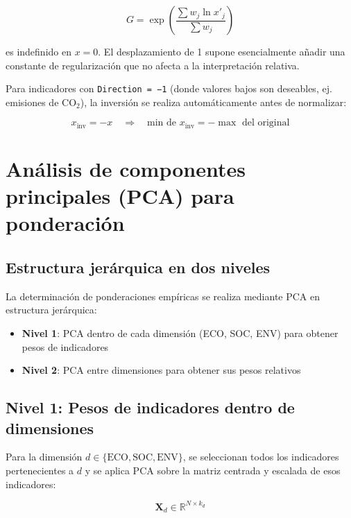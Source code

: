 \begin{equation}
    G = \exp\left(\frac{\sum w_j \ln x'_j}{\sum w_j}\right)
\end{equation}

es indefinido en $x = 0$. El desplazamiento de 1 supone esencialmente añadir una constante de regularización que no afecta a la interpretación relativa.

Para indicadores con \texttt{Direction = −1} (donde valores bajos son deseables, ej. emisiones de CO$_2$), la inversión se realiza automáticamente antes de normalizar:

\begin{equation}
    x_{\text{inv}} = -x \quad \Rightarrow \quad \text{min de } x_{\text{inv}} = -\max \text{ del original}
\end{equation}

\section{Análisis de componentes principales (PCA) para ponderación}

\subsection{Estructura jerárquica en dos niveles}

La determinación de ponderaciones empíricas se realiza mediante PCA en estructura jerárquica:

\begin{itemize}
    \item \textbf{Nivel 1}: PCA dentro de cada dimensión (ECO, SOC, ENV) para obtener pesos de indicadores
    \item \textbf{Nivel 2}: PCA entre dimensiones para obtener sus pesos relativos
\end{itemize}

\subsection{Nivel 1: Pesos de indicadores dentro de dimensiones}

Para la dimensión $d \in \{\text{ECO}, \text{SOC}, \text{ENV}\}$, se seleccionan todos los indicadores pertenecientes a $d$ y se aplica PCA sobre la matriz centrada y escalada de esos indicadores:

\begin{equation}
    \mathbf{X}_d \in \mathbb{R}^{N \times k_d}
\end{equation}

